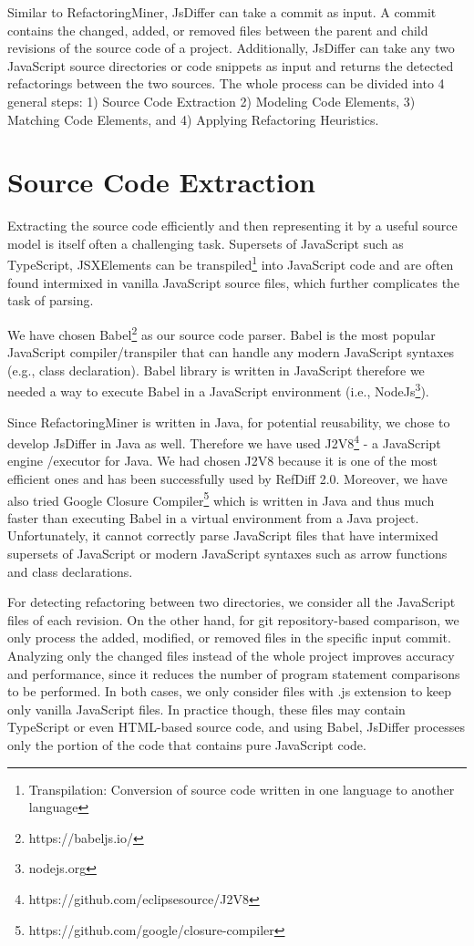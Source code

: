 \documentclass[letterpaper,12pt,onecolumn,final]{report}
\begin{document}
Similar to RefactoringMiner, JsDiffer can take a commit as input. A commit contains the changed, added, or removed files between the parent and child revisions of the source code of a project. Additionally, JsDiffer can take any two JavaScript source directories or code snippets as input and returns the detected refactorings between the two sources. The whole process can be divided into 4 general steps: 1) Source Code Extraction 2) Modeling Code Elements, 3) Matching Code Elements, and 4) Applying Refactoring Heuristics.


\section {Source Code Extraction}
Extracting the source code efficiently and then representing it by a useful source model is itself often a challenging task. Supersets of JavaScript such as TypeScript, JSXElements can be transpiled\footnote{Transpilation: Conversion of source code written in one language to another language} into JavaScript code and are often found intermixed in vanilla JavaScript source files, which further complicates the task of parsing.

We have chosen Babel\footnote{https://babeljs.io/} as our source code parser. Babel is the most popular JavaScript compiler/transpiler that can handle any modern JavaScript syntaxes (e.g., class declaration). Babel library is written in JavaScript therefore we needed a way to execute Babel in a JavaScript environment (i.e., NodeJs\footnote{nodejs.org}).

Since RefactoringMiner is written in Java, for potential reusability, we chose to develop JsDiffer in Java as well. Therefore we have used J2V8\footnote{https://github.com/eclipsesource/J2V8} - a JavaScript engine /executor for Java. We had chosen J2V8 because it is one of the most efficient ones and has been successfully used by RefDiff 2.0\cite{Silva2020}. Moreover, we have also tried Google Closure Compiler\footnote{https://github.com/google/closure-compiler} which is written in Java and thus much faster than executing Babel in a virtual environment from a Java project. Unfortunately, it cannot correctly parse JavaScript files that have intermixed supersets of JavaScript or modern JavaScript syntaxes such as arrow functions and class declarations.

For detecting refactoring between two directories, we consider all the JavaScript files of each revision. On the other hand, for git repository-based comparison, we only process the added, modified, or removed files in the specific input commit. Analyzing only the changed files instead of the whole project improves accuracy and performance, since it reduces the number of program statement comparisons to be performed. In both cases, we only consider files with .js extension to keep only vanilla JavaScript files. In practice though, these files may contain TypeScript or even HTML-based source code, and using Babel, JsDiffer processes only the portion of the code that contains pure JavaScript code.
\end{document}
